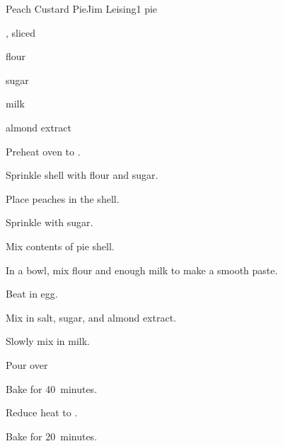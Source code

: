 \begin{recipe}{Peach Custard Pie}{Jim Leising}{1 pie}

\begin{ingredients}
\item {}, sliced
\item flour
\item sugar
\item milk
\item \tp{\half} almond extract
\end{ingredients}

\begin{directions}
\item Preheat oven to .
\item Sprinkle shell with flour and sugar.
\item Place peaches in the shell.
\item Sprinkle with \C{\threequarter} sugar.
\item Mix contents of pie shell.
\item In a bowl, mix  flour and enough milk to make a smooth paste.
\item Beat in egg.
\item Mix in salt,  sugar, and almond extract.
\item Slowly mix in \C{\half} milk.
\item Pour over 
\item Bake for 40~minutes.
\item Reduce heat to .
\item Bake for 20~minutes.
\end{directions}

\end{recipe}
